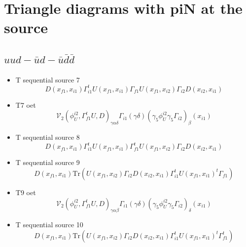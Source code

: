 \documentclass{article}[12pt]
\begin{document}
\section{Triangle diagrams with piN at the source}
\subsection{$uud-\bar{u}d-\bar{u}\bar{d}\bar{d}$}
\begin{itemize}
\item T sequential source 7
$$
D(x_{f1},x_{i1})\Gamma_{i1}^tU(x_{f1},x_{i1})\Gamma_{f1}U(x_{f1},x_{i2})\Gamma_{i2}D(x_{i2},x_{i1})
$$
\item T7 oet
$$
{\mathcal V}_2\left(\phi_U^{i2},\Gamma_{f1}^tU,D\right)_{\gamma\alpha\delta}
\Gamma_{i1}(\gamma\delta)(\gamma_5\phi_U^{i2}\gamma_5\Gamma_{i2})_\beta(x_{i1})
$$
\item T sequential source 8
$$
D(x_{f1},x_{i1})\Gamma_{i1}^tU(x_{f1},x_{i1})\Gamma_{f1}^tU(x_{f1},x_{i2})\Gamma_{i2}D(x_{i2},x_{i1})
$$
\item T sequential source 9
$$
D(x_{f1},x_{i1})\mathrm{Tr}\left(U(x_{f1},x_{i2})\Gamma_{i2}D(x_{i2},x_{i1})\Gamma_{i1}^tU(x_{f1},x_{i1})^t\Gamma_{f1}\right)
$$
\item T9 oet
$$
{\mathcal V}_2\left(\phi_U^{i2},\Gamma_{f1}^tU,D\right)_{\gamma\alpha\beta}
\Gamma_{i1}(\gamma\delta)(\gamma_5\phi_U^{i2}\gamma_5\Gamma_{i2})_\delta(x_{i1})
$$
\item T sequential source 10
$$
D(x_{f1},x_{i1})\mathrm{Tr}\left(U(x_{f1},x_{i2})\Gamma_{i2}D(x_{i2},x_{i1})\Gamma_{i1}^tU(x_{f1},x_{i1})^t\Gamma_{f1}^t\right)
$$
\end{itemize}
\end{document}
